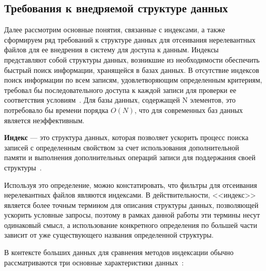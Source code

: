 \subsection{Требования к внедряемой структуре данных}\label{subsec:requirements}

Далее рассмотрим основные понятия, связанные с индексами, а также сформируем ряд требований к структуре данных для отсеивания нерелевантных файлов для ее внедрения в систему для доступа к данным. Индексы представляют собой структуры данных, возникшие из необходимости обеспечить быстрый поиск информации, хранящейся в базах данных. В отсутствие индексов поиск информации по всем записям, удовлетворяющим определенным критериям, требовал бы последовательного доступа к каждой записи для проверки ее соответствия условиям~\cite{Tree_Data_Structures_and_Efficient_Indexing_Techniques}. Для базы данных, содержащей N элементов, это потребовало бы времени порядка $O(N)$, что для современных баз данных является неэффективным.

\begin{definition}
    \textbf{Индекс} --- это структура данных, которая позволяет ускорить процесс поиска записей с определенным свойством за счет использования дополнительной памяти и выполнения дополнительных операций записи для поддержания своей структуры~\cite{Tree_Data_Structures_and_Efficient_Indexing_Techniques}.
\end{definition}

Используя это определение, можно констатировать, что фильтры для отсеивания нерелевантных файлов являются индексами. В действительности, {<<индекс>>} является более точным термином для описания структуры данных, позволяющей ускорить условные запросы, поэтому в рамках данной работы эти термины несут одинаковый смысл, а использование конкретного определения по большей части зависит от уже существующего названия определенной структуры. 

В контексте больших данных для сравнения методов индексации обычно рассматриваются три основные характеристики данных~\cite{Big_data_The_Vs}:

